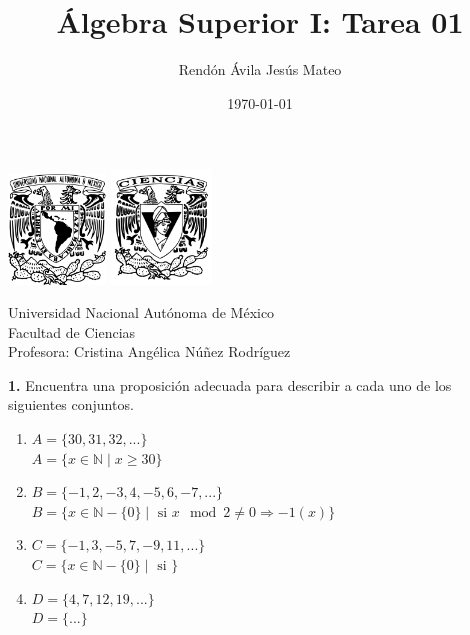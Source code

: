 \documentclass[12pt]{article}
\title{\textbf{Álgebra Superior I: Tarea 01}}
\author{Rendón Ávila Jesús Mateo}
\date{\today}
\begin{document}
\maketitle
\begin{center}
\vspace{3cm}
\includegraphics[width=0.195\textwidth]{Escudo.png}
\hspace{0.5cm}
\includegraphics[width=0.2\textwidth]{logo_ciencias.png}
\end{center}
\begin{center}
    \vspace{1cm}
    Universidad Nacional Autónoma de México\\
    Facultad de Ciencias\\
    Profesora: Cristina Angélica Núñez Rodríguez\\
\end{center}

\newpage

%
%
\textbf{1.} Encuentra una proposición adecuada para describir a cada uno de los siguientes conjuntos.
\begin{enumerate}[label=\alph*)]
    \item $A = \{30, 31, 32, ...\}$\\
    $A = \{x \in \mathbb{N} \mid x \geq 30\}$
    \item $B = \{-1, 2, -3, 4, -5, 6, -7, ...\}$\\
    $B = \{x \in \mathbb{N}-\{0\} \mid \text{ si } x \mod 2 \neq 0 \Rightarrow -1(x)\}$
    \item $C = \{-1, 3, -5, 7, -9, 11, ...\}$\\
    $C = \{x \in \mathbb{N} - \{0\} \mid \text{ si } \}$
    \item $D = \{4, 7, 12, 19, ...\}$\\
    $D = \{...\}$
\end{enumerate}
\end{document}
